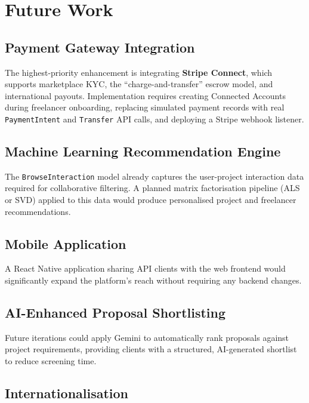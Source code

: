 \section{Future Work}

\subsection{Payment Gateway Integration}

The highest-priority enhancement is integrating \textbf{Stripe Connect}, which supports
marketplace KYC, the ``charge-and-transfer'' escrow model, and international payouts.
Implementation requires creating Connected Accounts during freelancer onboarding, replacing
simulated payment records with real \texttt{PaymentIntent} and \texttt{Transfer} API
calls, and deploying a Stripe webhook listener.

\subsection{Machine Learning Recommendation Engine}

The \texttt{BrowseInteraction} model already captures the user-project interaction data
required for collaborative filtering. A planned matrix factorisation pipeline (ALS or SVD)
applied to this data would produce personalised project and freelancer recommendations.

\subsection{Mobile Application}

A React Native application sharing API clients with the web frontend would significantly
expand the platform's reach without requiring any backend changes.

\subsection{AI-Enhanced Proposal Shortlisting}

Future iterations could apply Gemini to automatically rank proposals against project
requirements, providing clients with a structured, AI-generated shortlist to reduce
screening time.

\subsection{Internationalisation}

